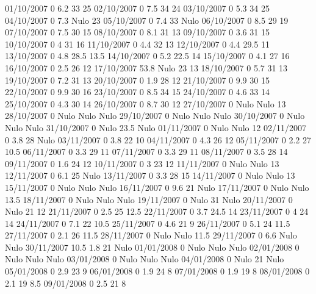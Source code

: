 01/10/2007  0      6.2    33     25 
02/10/2007  0      7.5    34     24 
03/10/2007  0      5.3    34     25 
04/10/2007  0      7.3   Nulo    23 
05/10/2007  0      7.4    33    Nulo
06/10/2007  0      8.5    29     19 
07/10/2007  0      7.5    30     15 
08/10/2007  0      8.1    31     13 
09/10/2007  0      3.6    31     15 
10/10/2007  0      4      31     16 
11/10/2007  0      4.4    32     13 
12/10/2007  0      4.4    29.5   11 
13/10/2007  0      4.8    28.5   13.5 
14/10/2007  0      5.2    22.5   14 
15/10/2007  0      4.1    27     16 
16/10/2007  0      2.5    26     12 
17/10/2007  53.8  Nulo    23     13 
18/10/2007  0      5.7    31     13 
19/10/2007  0      7.2    31     13 
20/10/2007  0      1.9    28     12 
21/10/2007  0      9.9    30     15 
22/10/2007  0      9.9    30     16 
23/10/2007  0      8.5    34     15 
24/10/2007  0      4.6    33     14 
25/10/2007  0      4.3    30     14 
26/10/2007  0      8.7    30     12 
27/10/2007  0     Nulo   Nulo    13 
28/10/2007  0     Nulo   Nulo   Nulo
29/10/2007  0     Nulo   Nulo   Nulo
30/10/2007  0     Nulo   Nulo   Nulo
31/10/2007  0     Nulo    23.5  Nulo
01/11/2007  0     Nulo   Nulo    12 
02/11/2007  0      3.8    28    Nulo
03/11/2007  0      3.8    22     10 
04/11/2007  0      4.3    26     12 
05/11/2007  0      2.2    27     10.5 
06/11/2007  0      3.3    29     11 
07/11/2007  0      3.3    29     11 
08/11/2007  0      3.5    28     14 
09/11/2007  0      1.6    24     12 
10/11/2007  0      3      23     12 
11/11/2007  0     Nulo   Nulo    13 
12/11/2007  0      6.1    25    Nulo
13/11/2007  0      3.3    28     15 
14/11/2007  0     Nulo   Nulo    13 
15/11/2007  0     Nulo   Nulo   Nulo
16/11/2007  0      9.6    21    Nulo
17/11/2007  0     Nulo   Nulo    13.5 
18/11/2007  0     Nulo   Nulo   Nulo
19/11/2007  0     Nulo    31    Nulo
20/11/2007  0     Nulo    21     12 
21/11/2007  0      2.5    25     12.5 
22/11/2007  0      3.7    24.5   14 
23/11/2007  0      4      24     14 
24/11/2007  0      7.1    22     10.5 
25/11/2007  0      4.6    21     9 
26/11/2007  0      5.1    24     11.5 
27/11/2007  0      2.1    26     11.5 
28/11/2007  0     Nulo   Nulo    11.5 
29/11/2007  0      6.6   Nulo   Nulo
30/11/2007  10.5   1.8    21    Nulo
01/01/2008  0     Nulo   Nulo   Nulo
02/01/2008  0     Nulo   Nulo   Nulo
03/01/2008  0     Nulo   Nulo   Nulo
04/01/2008  0     Nulo    21    Nulo
05/01/2008  0      2.9    23     9 
06/01/2008  0      1.9    24     8 
07/01/2008  0      1.9    19     8 
08/01/2008  0      2.1    19     8.5 
09/01/2008  0      2.5    21     8 
